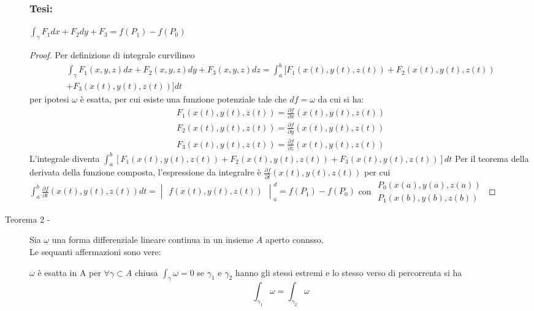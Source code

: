 \begin{description}
\begin{multicols}{2}
			\subsubsection{Tesi:}
				$\displaystyle\int_\gamma
				F_1dx + F_2 dy+ F_3=f(P_1)-f(P_0)$
		\end{multicols}
		\begin{proof}
			Per definizione di integrale curvilineo
			\begin{eqnarray*}
				\int_\gamma F_1(x,y,z)dx + F_2(x,y,z) dy+ F_3(x,y,z)dz =
				\int_{a}^{b} [F_1(x(t),y(t),z(t)) + F_2(x(t),y(t),z(t))\\ +
				F_3(x(t),y(t),z(t))]dt
			\end{eqnarray*}
			per ipotesi $\omega$ è esatta, per cui esiste una funzione
			potenziale tale che $df=\omega$ da cui si ha:
			\begin{equation*}
				\begin{matrix}
					F_1(x(t),y(t),z(t))=\frac{\partial f}{\partial x}(x(t),y(t),z(t)) \\
					F_2(x(t),y(t),z(t))=\frac{\partial f}{\partial y}(x(t),y(t),z(t)) \\
					F_3(x(t),y(t),z(t))=\frac{\partial f}{\partial z}(x(t),y(t),z(t))
				\end{matrix}
			\end{equation*}
			L'integrale diventa $\int_{a}^{b} [F_1(x(t),y(t),z(t)) + 
			F_2(x(t),y(t),z(t)) + F_3(x(t),y(t),z(t))]dt$
			\clearpage
			Per il teorema della derivata della funzione composta,
			l'espressione da integralre è
			$\frac{\partial f}{\partial t}(x(t),y(t),z(t))$ per cui
			$\int_{a}^{b}\frac{\partial f}{\partial t}(x(t),y(t),z(t))dt=
			\begin{vmatrix}
				f(x(t),y(t),z(t))
			\end{vmatrix}^d_a=f(P_1)-f(P_0)$ con $\begin{matrix}
				P_0(x(a),y(a),z(a))\\
				P_1(x(b),y(b),z(b))
			\end{matrix}$
		\end{proof}
	\item[Teorema 2 -] Sia $\omega$ una forma differenziale lineare continua in
		un insieme $A$ aperto connsso.\\
		Le sequanti affermazioni sono vere:
		\begin{tasks}
			\task $\omega$ è esatta in A
			\task per $\forall \gamma \subset A$ chiusa $\int_\gamma \omega=0$
			\task se $\gamma_1$ e $\gamma_2$ hanno gli stessi estremi e lo
			stesso verso di percorrenta si ha
			\begin{equation*}
				\int_{\gamma_1} \omega=\int_{\gamma_2}\omega
			\end{equation*}
		\end{tasks}
\end{description}
